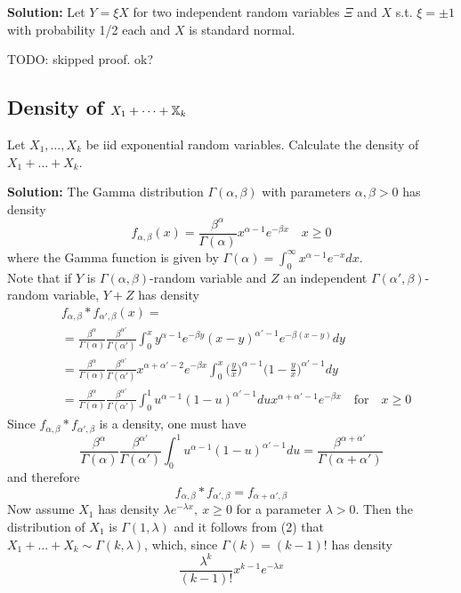 \textbf{Solution:} Let $Y = \xi X$ for two independent random variables $\Xi$ and $X$ s.t. $\xi = \pm 1$ with probability 1/2 each and $X$ is standard normal.

TODO: skipped proof. ok?

%
%
\subsection*{Density of $X_1 + \dots + \mathbb{X}_k$}
Let $X_1, \dots, X_k$ be iid exponential random variables. Calculate the density of $X_1 + \dots + X_k$.

\textbf{Solution:} The Gamma distribution $\Gamma(\alpha, \beta)$ with parameters $\alpha, \beta > 0$ has density
\[
    f_{\alpha, \beta}(x) = \frac{\beta^\alpha}{\Gamma(\alpha)}x^{\alpha - 1}e^{-\beta x} \quad x \geq 0
\]
where the Gamma function is given by $\Gamma(\alpha) = \int_0^\infty x^{\alpha -1}e^{-x} dx$. \\
Note that if $Y$ is $\Gamma(\alpha, \beta)$-random variable and $Z$ an independent $\Gamma(\alpha',\beta)$-random variable, $Y+Z$ has density
\begin{align*}
    &f_{\alpha,\beta}*f_{\alpha', \beta}(x) = \\
    &= \frac{\beta^\alpha}{\Gamma(\alpha)}\frac{\beta^{\alpha'}}{\Gamma(\alpha')}\int_0^x y^{\alpha -1}e^{-\beta y}(x - y)^{\alpha'-1}e^{-\beta(x-y)}dy \\
    &= \frac{\beta^\alpha}{\Gamma(\alpha)}\frac{\beta^{\alpha'}}{\Gamma(\alpha')}x^{\alpha + \alpha' -2}e^{-\beta x}\int_0^x \bigg(\frac{y}{x}\bigg)^{\alpha -1}\bigg(1 - \frac{y}{x}\bigg)^{\alpha' - 1}dy \\
    &= \frac{\beta^\alpha}{\Gamma(\alpha)}\frac{\beta^{\alpha'}}{\Gamma(\alpha')} \int_0^1 u^{\alpha -1}(1 - u)^{\alpha'-1}du x^{\alpha + \alpha' - 1}e^{-\beta x} \quad \text{for} \quad x \geq 0
\end{align*}
Since $f_{\alpha,\beta}*f_{\alpha', \beta}$ is a density, one must have
\[
    \frac{\beta^\alpha}{\Gamma(\alpha)}\frac{\beta^{\alpha'}}{\Gamma(\alpha')}\int_0^1 u^{\alpha -1}(1-u)^{\alpha'-1}du = \frac{\beta^{\alpha + \alpha'}}{\Gamma(\alpha + \alpha')}
\]
and therefore
\[
    f_{\alpha,\beta}*f_{\alpha', \beta} = f_{\alpha + \alpha',\beta} \tag{2}
\]
Now assume $X_1$ has density $\lambda e^{-\lambda x}, \ x \geq 0$ for a parameter $\lambda > 0$. Then the distribution of $X_1$ is $\Gamma(1,\lambda)$ and it follows from (2) that $X_1 + \dots + X_k \sim \Gamma(k,\lambda)$, which, since $\Gamma(k) = (k-1)!$ has density
\[
    \frac{\lambda^k}{(k-1)!}x^{k-1}e^{-\lambda x}
\]

